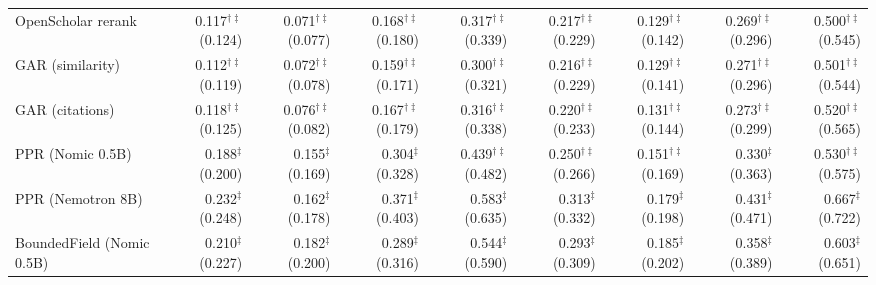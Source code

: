 \begin{table}[t]
\begin{subtable}{\textwidth}
\begin{tabular}{lrrrrrrrr}
OpenScholar rerank & 0.117$^{\dagger\ddagger}$ (0.124) & 0.071$^{\dagger\ddagger}$ (0.077) & 0.168$^{\dagger\ddagger}$ (0.180) & 0.317$^{\dagger\ddagger}$ (0.339) & 0.217$^{\dagger\ddagger}$ (0.229) & 0.129$^{\dagger\ddagger}$ (0.142) & 0.269$^{\dagger\ddagger}$ (0.296) & 0.500$^{\dagger\ddagger}$ (0.545) \\
GAR (similarity) & 0.112$^{\dagger\ddagger}$ (0.119) & 0.072$^{\dagger\ddagger}$ (0.078) & 0.159$^{\dagger\ddagger}$ (0.171) & 0.300$^{\dagger\ddagger}$ (0.321) & 0.216$^{\dagger\ddagger}$ (0.229) & 0.129$^{\dagger\ddagger}$ (0.141) & 0.271$^{\dagger\ddagger}$ (0.296) & 0.501$^{\dagger\ddagger}$ (0.544) \\
GAR (citations) & 0.118$^{\dagger\ddagger}$ (0.125) & 0.076$^{\dagger\ddagger}$ (0.082) & 0.167$^{\dagger\ddagger}$ (0.179) & 0.316$^{\dagger\ddagger}$ (0.338) & 0.220$^{\dagger\ddagger}$ (0.233) & 0.131$^{\dagger\ddagger}$ (0.144) & 0.273$^{\dagger\ddagger}$ (0.299) & 0.520$^{\dagger\ddagger}$ (0.565) \\
PPR (Nomic 0.5B) & 0.188$^{\ddagger}$ (0.200) & 0.155$^{\ddagger}$ (0.169) & 0.304$^{\ddagger}$ (0.328) & 0.439$^{\dagger\ddagger}$ (0.482) & 0.250$^{\dagger\ddagger}$ (0.266) & 0.151$^{\dagger\ddagger}$ (0.169) & 0.330$^{\ddagger}$ (0.363) & 0.530$^{\dagger\ddagger}$ (0.575) \\
PPR (Nemotron 8B) & 0.232$^{\ddagger}$ (0.248) & 0.162$^{\ddagger}$ (0.178) & 0.371$^{\ddagger}$ (0.403) & 0.583$^{\ddagger}$ (0.635) & 0.313$^{\ddagger}$ (0.332) & 0.179$^{\ddagger}$ (0.198) & 0.431$^{\ddagger}$ (0.471) & 0.667$^{\ddagger}$ (0.722) \\
\midrule
BoundedField (Nomic 0.5B) & 0.210$^{\ddagger}$ (0.227) & 0.182$^{\ddagger}$ (0.200) & 0.289$^{\ddagger}$ (0.316) & 0.544$^{\ddagger}$ (0.590) & 0.293$^{\ddagger}$ (0.309) & 0.185$^{\ddagger}$ (0.202) & 0.358$^{\ddagger}$ (0.389) & 0.603$^{\ddagger}$ (0.651) \\

\end{tabular}
\end{subtable}
\end{table}
